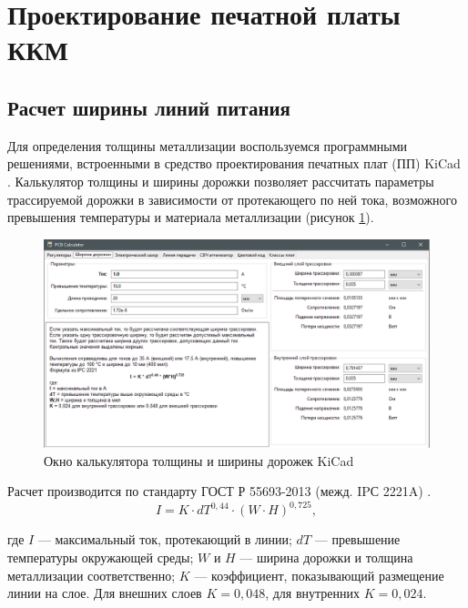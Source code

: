 \documentclass[utf8x, 14pt, oneside, a4paper]{article}
\begin{document}
	\pagebreak
	
	
	
	\section{Проектирование печатной платы ККМ}
	
		\subsection{Расчет ширины линий питания}
		
		Для определения толщины металлизации воспользуемся программными решениями, встроенными в средство проектирования печатных плат (ПП) KiCad \cite{bib:kicad}. Калькулятор толщины и ширины дорожки позволяет рассчитать параметры трассируемой дорожки в зависимости от протекающего по ней тока, возможного превышения температуры и материала металлизации (рисунок \ref{fig:kicad-calc-trassing}).
		
		\begin{figure}[H]
			\centering
			\includegraphics[width=0.9\linewidth]{"Рисунки/KiCad-calc-trassing"}
			\caption{Окно калькулятора толщины и ширины дорожек KiCad}
			\label{fig:kicad-calc-trassing}
		\end{figure}
	
		Расчет производится по стандарту ГОСТ Р 55693-2013 (межд. IPС 2221A) \cite{bib:gost_55693}.
		\begin{equation}
			I = K \cdot dT^{0,44} \cdot (W \cdot H)^{0,725},
		\end{equation}
	
		\noindent где $I$ --- максимальный ток, протекающий в линии; $dT$ --- превышение температуры окружающей среды; $W$ и $H$ --- ширина дорожки и толщина металлизации соответственно; $K$ --- коэффициент, показывающий размещение линии на слое. Для внешних слоев $K = 0,048$, для внутренних $K = 0,024$.
				
\end{document}
